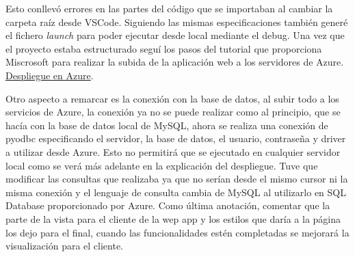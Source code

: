 Esto conllevó errores en las partes del código que se importaban al cambiar la carpeta raíz desde VSCode. Siguiendo las mismas especificaciones también generé el fichero \textit{launch} para poder ejecutar desde local mediante el debug.\newline
Una vez que el proyecto estaba estructurado seguí los pasos del tutorial que proporciona Miscrosoft para realizar la subida de la aplicación web a los servidores de Azure. \href{https://docs.microsoft.com/es-es/azure/developer/python/tutorial-deploy-app-service-on-linux-01}{Despliegue en Azure}\cite{deployVSCode}.\newline

Otro aspecto a remarcar es la conexión con la base de datos, al subir todo a los servicios de Azure, la conexión ya no se puede realizar como al principio, que se hacía con la base de datos local de MySQL, ahora se realiza una conexión de pyodbc especificando el servidor, la base de datos, el usuario, contraseña y driver a utilizar desde Azure. Esto no permitirá que se ejecutado en cualquier servidor local como se verá más adelante en la explicación del despliegue. Tuve que modificar las consultas que realizaba ya que no serían desde el mismo cursor ni la misma conexión y el lenguaje de consulta cambia de MySQL al utilizarlo en SQL Database proporcionado por Azure.\newline
Como última anotación, comentar que la parte de la vista para el cliente de la wep app y los estilos que daría a la página los dejo para el final, cuando las funcionalidades estén completadas se mejorará la visualización para el cliente.\newline




